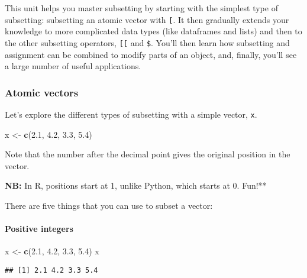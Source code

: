 \documentclass[
]{book}
\newenvironment{Shaded}{\begin{snugshade}}{\end{snugshade}}
\newcommand{\FloatTok}[1]{\textcolor[rgb]{0.00,0.00,0.81}{#1}}
\newcommand{\KeywordTok}[1]{\textcolor[rgb]{0.13,0.29,0.53}{\textbf{#1}}}
\newcommand{\NormalTok}[1]{#1}
\newcommand{\StringTok}[1]{\textcolor[rgb]{0.31,0.60,0.02}{#1}}
\begin{document}
This unit helps you master subsetting by starting with the simplest type of subsetting: subsetting an atomic vector with \texttt{{[}}. It then gradually extends your knowledge to more complicated data types (like dataframes and lists) and then to the other subsetting operators, \texttt{{[}{[}} and \texttt{\$}. You'll then learn how subsetting and assignment can be combined to modify parts of an object, and, finally, you'll see a large number of useful applications.

\hypertarget{atomic-vectors}{%
\subsubsection{Atomic vectors}\label{atomic-vectors}}

Let's explore the different types of subsetting with a simple vector, \texttt{x}.

\begin{Shaded}
\begin{Highlighting}[]
\NormalTok{x \textless{}{-}}\StringTok{ }\KeywordTok{c}\NormalTok{(}\FloatTok{2.1}\NormalTok{, }\FloatTok{4.2}\NormalTok{, }\FloatTok{3.3}\NormalTok{, }\FloatTok{5.4}\NormalTok{)}
\end{Highlighting}
\end{Shaded}

Note that the number after the decimal point gives the original position in the vector.

\textbf{NB:} In R, positions start at 1, unlike Python, which starts at 0. Fun!**

There are five things that you can use to subset a vector:

\hypertarget{positive-integers}{%
\paragraph{Positive integers}\label{positive-integers}}

\begin{Shaded}
\begin{Highlighting}[]
\NormalTok{x \textless{}{-}}\StringTok{ }\KeywordTok{c}\NormalTok{(}\FloatTok{2.1}\NormalTok{, }\FloatTok{4.2}\NormalTok{, }\FloatTok{3.3}\NormalTok{, }\FloatTok{5.4}\NormalTok{)}
\NormalTok{x}
\end{Highlighting}
\end{Shaded}

\begin{verbatim}
## [1] 2.1 4.2 3.3 5.4
\end{verbatim}
\end{document}
